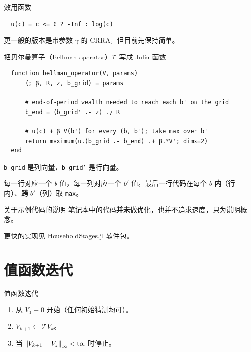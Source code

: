 \documentclass[10pt,aspectratio=169]{beamer}
\begin{document}
\begin{frame}[fragile]{效用函数}
  \begin{lstlisting}
  u(c) = c <= 0 ? -Inf : log(c)
  \end{lstlisting}
  更一般的版本是带参数 $\gamma$ 的 CRRA，但目前先保持简单。
\end{frame}

\begin{frame}[fragile]{把贝尔曼算子（Bellman operator）$\mathcal{T}$ 写成 Julia 函数}
  \begin{lstlisting}
  function bellman_operator(V, params)
      (; β, R, z, b_grid) = params

      # end-of-period wealth needed to reach each b' on the grid
      b_end = (b_grid' .- z) ./ R

      # u(c) + β V(b') for every (b, b'); take max over b'
      return maximum(u.(b_grid .- b_end) .+ β.*V'; dims=2)
  end
  \end{lstlisting}
  \texttt{b\_grid} 是列向量，\texttt{b\_grid'} 是行向量。

  每一行对应一个 $b$ 值，每一列对应一个 $b'$ 值。最后一行代码在每个 $b$ \textbf{内}（行内）、\textbf{跨} $b'$（列）取 \texttt{max}。
\end{frame}

\begin{frame}{关于示例代码的说明}
  笔记本中的代码\textbf{并未}做优化，也并不追求速度，只为说明概念。

  更快的实现见 HouseholdStages.jl 软件包。
\end{frame}

\section{值函数迭代}

\begin{frame}{值函数迭代}
  \begin{enumerate}
    \item 从 $V_0 \equiv 0$ 开始（任何初始猜测均可）。
    \vspace{0.4em}
    \item $V_{k+1} \leftarrow \mathcal{T} V_k$。
    \vspace{0.4em}
    \item 当 $\left\| V_{k+1} - V_k \right\|_\infty < \text{tol}$ 时停止。
  \end{enumerate}
\end{frame}
\end{document}
